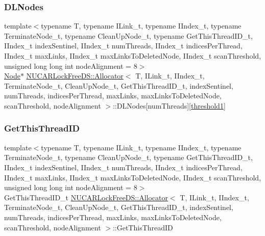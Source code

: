 \subsubsection{\texorpdfstring{D\+L\+Nodes}{DLNodes}}
{\footnotesize\ttfamily template$<$typename T, typename I\+Link\+\_\+t, typename I\+Index\+\_\+t, typename Terminate\+Node\+\_\+t, typename Clean\+Up\+Node\+\_\+t, typename Get\+This\+Thread\+I\+D\+\_\+t, I\+Index\+\_\+t index\+Sentinel, I\+Index\+\_\+t num\+Threads, I\+Index\+\_\+t indices\+Per\+Thread, I\+Index\+\_\+t max\+Links, I\+Index\+\_\+t max\+Links\+To\+Deleted\+Node, I\+Index\+\_\+t scan\+Threshold, unsigned long long int node\+Alignment = 8$>$ \\
\mbox{\hyperlink{class_n_u_c_a_r_lock_free_d_s_1_1_allocator_1_1_node}{Node}}$\ast$ \mbox{\hyperlink{class_n_u_c_a_r_lock_free_d_s_1_1_allocator}{N\+U\+C\+A\+R\+Lock\+Free\+D\+S\+::\+Allocator}}$<$ T, I\+Link\+\_\+t, I\+Index\+\_\+t, Terminate\+Node\+\_\+t, Clean\+Up\+Node\+\_\+t, Get\+This\+Thread\+I\+D\+\_\+t, index\+Sentinel, num\+Threads, indices\+Per\+Thread, max\+Links, max\+Links\+To\+Deleted\+Node, scan\+Threshold, node\+Alignment $>$\+::D\+L\+Nodes\mbox{[}num\+Threads\mbox{]}\mbox{[}\mbox{\hyperlink{class_n_u_c_a_r_lock_free_d_s_1_1_allocator_a1d220e1cc963fc9fb37e46a416504715}{threshold1}}\mbox{]}\hspace{0.3cm}{\ttfamily [private]}}

\mbox{\label{class_n_u_c_a_r_lock_free_d_s_1_1_allocator_adcefaf024a5ea626d6e045aab70057b9}} 
\subsubsection{\texorpdfstring{Get\+This\+Thread\+ID}{GetThisThreadID}}
{\footnotesize\ttfamily template$<$typename T, typename I\+Link\+\_\+t, typename I\+Index\+\_\+t, typename Terminate\+Node\+\_\+t, typename Clean\+Up\+Node\+\_\+t, typename Get\+This\+Thread\+I\+D\+\_\+t, I\+Index\+\_\+t index\+Sentinel, I\+Index\+\_\+t num\+Threads, I\+Index\+\_\+t indices\+Per\+Thread, I\+Index\+\_\+t max\+Links, I\+Index\+\_\+t max\+Links\+To\+Deleted\+Node, I\+Index\+\_\+t scan\+Threshold, unsigned long long int node\+Alignment = 8$>$ \\
Get\+This\+Thread\+I\+D\+\_\+t \mbox{\hyperlink{class_n_u_c_a_r_lock_free_d_s_1_1_allocator}{N\+U\+C\+A\+R\+Lock\+Free\+D\+S\+::\+Allocator}}$<$ T, I\+Link\+\_\+t, I\+Index\+\_\+t, Terminate\+Node\+\_\+t, Clean\+Up\+Node\+\_\+t, Get\+This\+Thread\+I\+D\+\_\+t, index\+Sentinel, num\+Threads, indices\+Per\+Thread, max\+Links, max\+Links\+To\+Deleted\+Node, scan\+Threshold, node\+Alignment $>$\+::Get\+This\+Thread\+ID\hspace{0.3cm}{\ttfamily [private]}}

